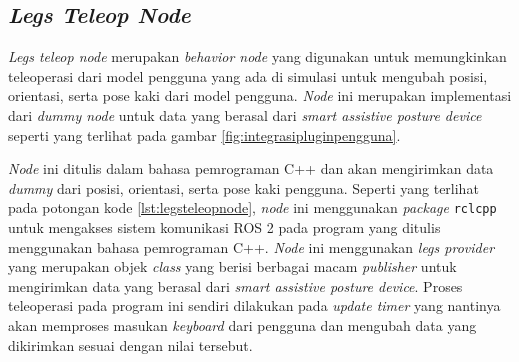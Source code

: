 \subsection{\emph{Legs Teleop Node}}
\label{subsec:legsteleopnode}

\emph{Legs teleop node} merupakan \emph{behavior node} yang digunakan untuk memungkinkan teleoperasi dari model pengguna yang ada di simulasi untuk mengubah posisi, orientasi, serta pose kaki dari model pengguna.
\emph{Node} ini merupakan implementasi dari \emph{dummy node} untuk data yang berasal dari \emph{smart assistive posture device} seperti yang terlihat pada gambar \ref{fig:integrasipluginpengguna}.



\emph{Node} ini ditulis dalam bahasa pemrograman C++ dan akan mengirimkan data \emph{dummy} dari posisi, orientasi, serta pose kaki pengguna.
Seperti yang terlihat pada potongan kode \ref{lst:legsteleopnode},
  \emph{node} ini menggunakan \emph{package} \lstinline{rclcpp} untuk mengakses sistem komunikasi ROS 2 pada program yang ditulis menggunakan bahasa pemrograman C++.
\emph{Node} ini menggunakan \emph{legs provider} yang merupakan objek \emph{class} yang berisi berbagai macam \emph{publisher} untuk mengirimkan data yang berasal dari \emph{smart assistive posture device}.
Proses teleoperasi pada program ini sendiri dilakukan pada \emph{update timer} yang nantinya akan memproses masukan \emph{keyboard} dari pengguna dan mengubah data yang dikirimkan sesuai dengan nilai tersebut.
